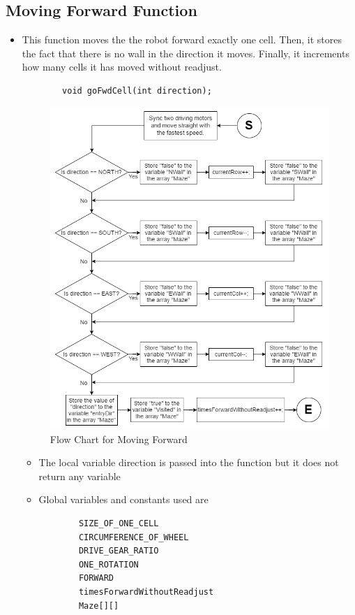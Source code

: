 \documentclass[11pt]{article}
\begin{document}
\subsection{Moving Forward Function}
\begin{itemize}
\item This function moves the the robot forward exactly one cell. Then, it stores the fact that there is no wall in the direction it moves. Finally, it increments how many cells it has moved without readjust. 
	\begin{verbatim}
		void goFwdCell(int direction);
	\end{verbatim}
\begin{figure}[htp]
\centering
\includegraphics[scale=0.56]{images/Software_Flowchart/Moving_Forward.png}
\caption{Flow Chart for Moving Forward}
\label{}
\end{figure}	
	\begin{itemize}
	\item The local variable direction is passed into the function but it does not return any variable
	\item Global variables and constants used are
	\begin{verbatim}
		SIZE_OF_ONE_CELL
		CIRCUMFERENCE_OF_WHEEL
		DRIVE_GEAR_RATIO
		ONE_ROTATION
		FORWARD
		timesForwardWithoutReadjust
		Maze[][]
	\end{verbatim}
	\end{itemize}
\end{itemize}
\newpage
\end{document}
